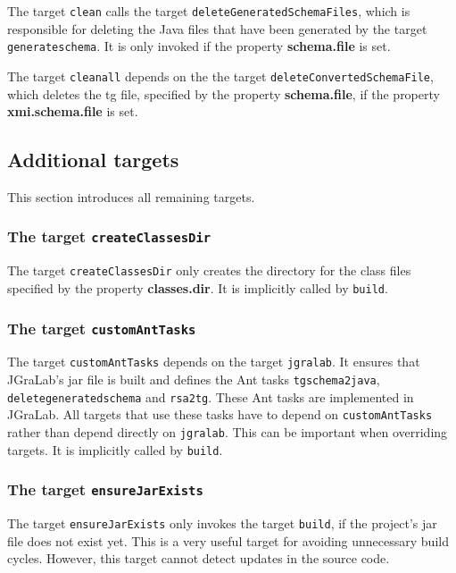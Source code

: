 \documentclass[a4paper,twoside,11pt,bibtotoc]{article}
\begin{document}
The target \texttt{clean} calls the target \texttt{deleteGeneratedSchemaFiles}, which is responsible for deleting the Java files that have been generated by the target \texttt{generateschema}.
It is only invoked if the property \textbf{schema.file} is set.

The target \texttt{cleanall} depends on the the target \texttt{deleteConvertedSchemaFile}, which deletes the tg file, specified by the property \textbf{schema.file}, if the property \textbf{xmi.schema.file} is set.


\subsection{Additional targets}
\label{sec:additional}
This section introduces all remaining targets.

\subsubsection{The target \texttt{createClassesDir}}
The target \texttt{createClassesDir} only creates the directory for the class files specified by the property \textbf{classes.dir}.
It is implicitly called by \texttt{build}.

\subsubsection{The target \texttt{customAntTasks}}
The target \texttt{customAntTasks} depends on the target \texttt{jgralab}.
It ensures that JGraLab's jar file is built and defines the Ant tasks \texttt{tgschema2java}, \texttt{deletegeneratedschema} and \texttt{rsa2tg}.
These Ant tasks are implemented in JGraLab.
All targets that use these tasks have to depend on \texttt{customAntTasks} rather than depend directly on \texttt{jgralab}.
This can be important when overriding targets.
It is implicitly called by \texttt{build}.

\subsubsection{The target \texttt{ensureJarExists}}
The target \texttt{ensureJarExists} only invokes the target \texttt{build}, if the project's jar file does not exist yet.
This is a very useful target for avoiding unnecessary build cycles.
However, this target cannot detect updates in the source code.%
\end{document}
